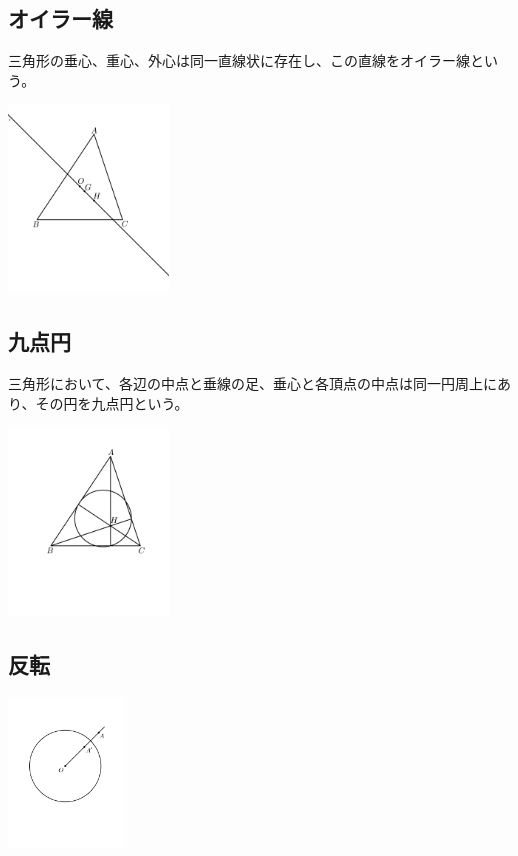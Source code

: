 \documentclass[uplatex,dvipdfmx]{jsbook}
\begin{document}
\subsection{オイラー線}
三角形の垂心、重心、外心は同一直線状に存在し、この直線をオイラー線という。

\includegraphics[clip,height=5cm]{figures/Euler.pdf}

\subsection{九点円}
三角形において、各辺の中点と垂線の足、垂心と各頂点の中点は同一円周上にあり、その円を九点円という。

\includegraphics[clip,height=5cm]{figures/Euler_circle.pdf}

\subsection{反転}
\includegraphics[clip,height=4cm]{figures/Hanten.pdf}
\end{document}
